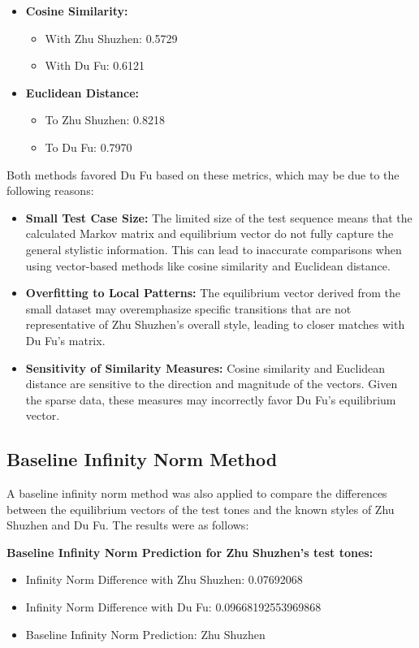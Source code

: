 \documentclass[12pt]{article}
\begin{document}
\begin{itemize}
    \item \textbf{Cosine Similarity:}
    \begin{itemize}
        \item With Zhu Shuzhen: 0.5729
        \item With Du Fu: 0.6121
    \end{itemize}
    \item \textbf{Euclidean Distance:}
    \begin{itemize}
        \item To Zhu Shuzhen: 0.8218
        \item To Du Fu: 0.7970
    \end{itemize}
\end{itemize}

\noindent Both methods favored Du Fu based on these metrics, which may be due to the following reasons:
\begin{itemize}
    \item \textbf{Small Test Case Size:} The limited size of the test sequence means that the calculated Markov matrix and equilibrium vector do not fully capture the general stylistic information. This can lead to inaccurate comparisons when using vector-based methods like cosine similarity and Euclidean distance.
    \item \textbf{Overfitting to Local Patterns:} The equilibrium vector derived from the small dataset may overemphasize specific transitions that are not representative of Zhu Shuzhen’s overall style, leading to closer matches with Du Fu's matrix.
    \item \textbf{Sensitivity of Similarity Measures:} Cosine similarity and Euclidean distance are sensitive to the direction and magnitude of the vectors. Given the sparse data, these measures may incorrectly favor Du Fu's equilibrium vector.
\end{itemize}

\subsection*{Baseline Infinity Norm Method}

A baseline infinity norm method was also applied to compare the differences between the equilibrium vectors of the test tones and the known styles of Zhu Shuzhen and Du Fu. The results were as follows:

\textbf{Baseline Infinity Norm Prediction for Zhu Shuzhen's test tones:}
\begin{itemize}
    \item Infinity Norm Difference with Zhu Shuzhen: 0.07692068
    \item Infinity Norm Difference with Du Fu: 0.09668192553969868
    \item Baseline Infinity Norm Prediction: Zhu Shuzhen
\end{itemize}
\end{document}
